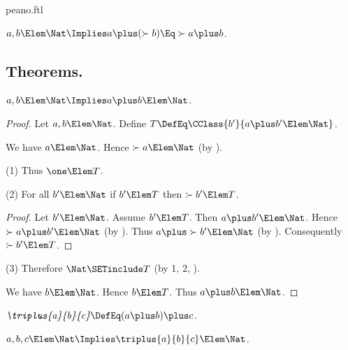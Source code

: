 \documentclass{stex}
\begin{document}
\begin{smodule}{peano.ftl}
\begin{forthel}
  \begin{axiom*}[title=18,name=P18]
    $a,b \Elem \Nat \Implies a \plus (\succ{b}) \Eq \succ{a \plus b}$.
  \end{axiom*}
\end{forthel}


\subsection{Theorems.}


\begin{forthel}
  \begin{theorem*}[title=19,name=P19]
    $a,b \Elem \Nat \Implies a \plus b \Elem \Nat$.
  \end{theorem*}
  \begin{proof}
    Let $a,b \Elem \Nat$.
    Define $T \DefEq \CClass{b'}{a \plus b' \Elem \Nat}$.
    
    We have $a \Elem \Nat$.
    Hence $\succ{a} \Elem \Nat$ (by ).
    
    (1) Thus $\one \Elem T$.

    (2) For all $b' \Elem \Nat$ if $b' \Elem T$ then $\succ{b'} \Elem T$.
    \begin{proof}
      Let $b' \Elem \Nat$.
      Assume $b' \Elem T$.
      Then $a \plus b' \Elem \Nat$.
      Hence $\succ{a \plus b'} \Elem \Nat$ (by ).
      Thus $a \plus \succ{b'} \Elem \Nat$ (by ).
      Consequently $\succ{b'} \Elem T$.
    \end{proof}

    (3) Therefore $\Nat \SETinclude T$ (by 1, 2, ).

    We have $b \Elem \Nat$.
    Hence $b \Elem T$.
    Thus $a \plus b \Elem \Nat$.
  \end{proof}

  \begin{definition*}[title=20,for=triplus]
    $\emph{\triplus{a}{b}{c}} \DefEq (a \plus b) \plus c$.
  \end{definition*}

  \begin{theorem*}[title=21,name=P21]
    $a,b,c \Elem \Nat \Implies \triplus{a}{b}{c} \Elem \Nat$.
  \end{theorem*}



\end{forthel}
\end{smodule}
\end{document}
